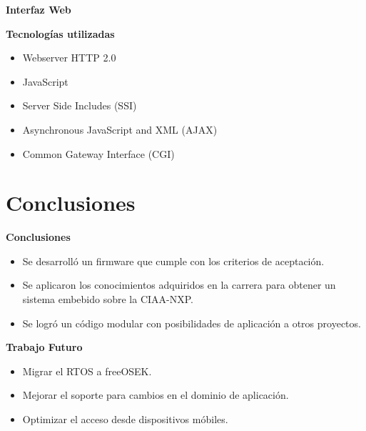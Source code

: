 \documentclass[11pt]{beamer}
\newcommand\Wider[2][3em]{%
  \makebox[\linewidth][c]{%
    \begin{minipage}{\dimexpr\textwidth+#1\relax}
      \raggedright#2
    \end{minipage}%
  }%
}
\begin{document}
\begin{frame}{\textbf{\LARGE{Interfaz Web}}}
  \Wider{
  }  	  	
\end{frame}

\begin{frame}{\textbf{\LARGE{Tecnologías utilizadas}}}
  \fontsize{18pt}{18}\selectfont
  \begin{itemize}
    \item Webserver HTTP 2.0
      \vspace{10px}
    \item JavaScript
      \vspace{10px}		
    \item Server Side Includes (SSI)
      \vspace{10px}
    \item Asynchronous JavaScript and XML (AJAX)
      \vspace{10px}
    \item Common Gateway Interface (CGI)
  \end{itemize}
\end{frame}

\section{Conclusiones}

\begin{frame}{\textbf{\LARGE{Conclusiones}}}
  \fontsize{16pt}{16}\selectfont
  \begin{itemize}
    \item Se desarrolló un firmware que cumple con los criterios de aceptación.
      \vspace{10px}
    \item Se aplicaron los conocimientos adquiridos en la carrera para obtener un sistema embebido sobre la CIAA-NXP.
      \vspace{10px}
    \item Se logró un código modular con posibilidades de aplicación a otros proyectos.
  \end{itemize}
\end{frame}

\begin{frame}{\textbf{\LARGE{Trabajo Futuro}}}
  \fontsize{16pt}{16}\selectfont
  \begin{itemize}
    \item Migrar el RTOS a freeOSEK.
      \vspace{15px}
    \item Mejorar el soporte para cambios en el dominio de aplicación.
      \vspace{15px}
    \item Optimizar el acceso desde dispositivos móbiles.
  \end{itemize}
\end{frame}
\end{document}
